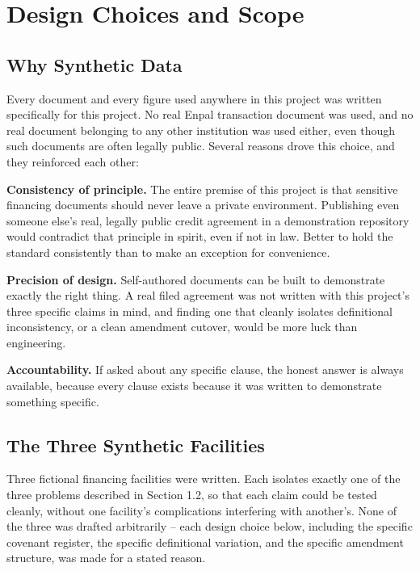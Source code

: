 \documentclass[11pt,a4paper]{article}
\begin{document}
\newpage
\section{Design Choices and Scope}

\subsection{Why Synthetic Data}

Every document and every figure used anywhere in this project was written specifically for this project. No real Enpal transaction document was used, and no real document belonging to any other institution was used either, even though such documents are often legally public. Several reasons drove this choice, and they reinforced each other:

\textbf{Consistency of principle.} The entire premise of this project is that sensitive financing documents should never leave a private environment. Publishing even someone else's real, legally public credit agreement in a demonstration repository would contradict that principle in spirit, even if not in law. Better to hold the standard consistently than to make an exception for convenience.

\textbf{Precision of design.} Self-authored documents can be built to demonstrate exactly the right thing. A real filed agreement was not written with this project's three specific claims in mind, and finding one that cleanly isolates definitional inconsistency, or a clean amendment cutover, would be more luck than engineering.

\textbf{Accountability.} If asked about any specific clause, the honest answer is always available, because every clause exists because it was written to demonstrate something specific.

\subsection{The Three Synthetic Facilities}

Three fictional financing facilities were written. Each isolates exactly one of the three problems described in Section 1.2, so that each claim could be tested cleanly, without one facility's complications interfering with another's. None of the three was drafted arbitrarily -- each design choice below, including the specific covenant register, the specific definitional variation, and the specific amendment structure, was made for a stated reason.
\end{document}
